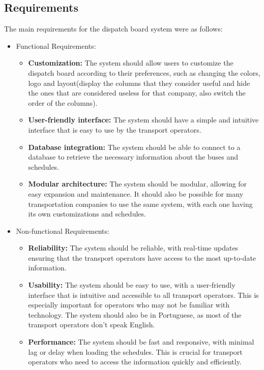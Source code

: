 \documentclass[10pt]{article}
\begin{document}
    \subsection{Requirements}
        The main requirements for the dispatch board system were as follows:
        \begin{itemize}
            \item Functional Requirements:
                \begin{itemize}
                    \item \textbf{Customization:} The system should allow users to customize the dispatch board according to their preferences, such as changing the colors, logo and layout(display the columns that they consider useful and hide the ones that are considered useless for that company, also switch the order of the columns).
                    \item \textbf{User-friendly interface:} The system should have a simple and intuitive interface that is easy to use by the transport operators.
                    \item \textbf{Database integration:} The system should be able to connect to a database to retrieve the necessary information about the buses and schedules.
                    \item \textbf{Modular architecture:} The system should be modular, allowing for easy expansion and maintenance. It should also be possible for many transportation companies to use the same system, with each one having its own customizations and schedules.
                \end{itemize}
            \item Non-functional Requirements:
                \begin{itemize}
                    \item \textbf{Reliability:} The system should be reliable, with real-time updates ensuring that the transport operators have access to the most up-to-date information.
                    \item \textbf{Usability:} The system should be easy to use, with a user-friendly interface that is intuitive and accessible to all transport operators. This is especially important for operators who may not be familiar with technology. The system should also be in Portuguese, as most of the transport operators don't speak English.
                    \item \textbf{Performance:} The system should be fast and responsive, with minimal lag or delay when loading the schedules. This is crucial for transport operators who need to access the information quickly and efficiently.

\end{itemize}
\end{itemize}
\end{document}
